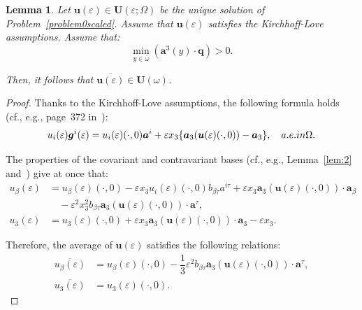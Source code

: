 \documentclass{amsart}
\newtheorem{lemma}{Lemma}[section]
\begin{document}
\begin{lemma}
	\label{average-constraint}
	Let $\bm{u}(\varepsilon) \in \bm{U}(\varepsilon;\Omega)$ be the unique solution of Problem~\ref{problem0scaled}. 
	Assume that $\bm{u}(\varepsilon)$ satisfies the Kirchhoff-Love assumptions.
	Assume that:
	\begin{equation*}
		\min_{y\in \overline{\omega}}(\bm{a}^3(y)\cdot\bm{q})>0.
	\end{equation*}
	
	Then, it follows that $\overline{\bm{u}(\varepsilon)} \in \bm{U}(\omega)$.
\end{lemma}
\begin{proof}
	Thanks to the Kirchhoff-Love assumptions, the following formula holds (cf., e.g., page~372 in~\cite{Ciarlet2000}):
	\begin{equation*}
		u_i(\varepsilon)\bm{g}^i(\varepsilon)=u_i(\varepsilon)(\cdot,0)\bm{a}^i+\varepsilon x_3 \{\bm{a}_3(\bm{u}(\varepsilon)(\cdot,0))-\bm{a}_3\},\quad\textup{ a.e. in } \Omega.
	\end{equation*}
	
	The properties of the covariant and contravariant bases (cf., e.g., Lemma~\ref{lem:2} and~\cite{Ciarlet2005}) give at once that:
	\begin{equation*}
		\begin{aligned}
			u_\beta(\varepsilon)&=u_\beta(\varepsilon)(\cdot,0) -\varepsilon x_3 u_i(\varepsilon)(\cdot,0) b_{\beta\tau} a^{i\tau}+\varepsilon x_3 \bm{a}_3(\bm{u}(\varepsilon)(\cdot,0))\cdot\bm{a}_\beta\\
			&\quad-\varepsilon^2 x_3^2 b_{\beta\tau}\bm{a}_3(\bm{u}(\varepsilon)(\cdot,0))\cdot\bm{a}^\tau,\\
			u_3(\varepsilon)&=u_3(\varepsilon)(\cdot,0)+\varepsilon x_3 \bm{a}_3(\bm{u}(\varepsilon)(\cdot,0)) \cdot \bm{a}_3 -\varepsilon x_3.
		\end{aligned}
	\end{equation*}
	
	Therefore, the average of $\bm{u}(\varepsilon)$ satisfies the following relations:
	\begin{equation}
		\label{avg}
		\begin{aligned}
			\overline{u_\beta(\varepsilon)}&=u_\beta(\varepsilon)(\cdot,0)-\dfrac{1}{3}\varepsilon^2 b_{\beta\tau} \bm{a}_3(\bm{u}(\varepsilon)(\cdot,0)) \cdot\bm{a}^\tau,\\
			\overline{u_3(\varepsilon)}&=u_3(\varepsilon)(\cdot,0).
		\end{aligned}
	\end{equation}
	

\end{proof}
\end{document}
